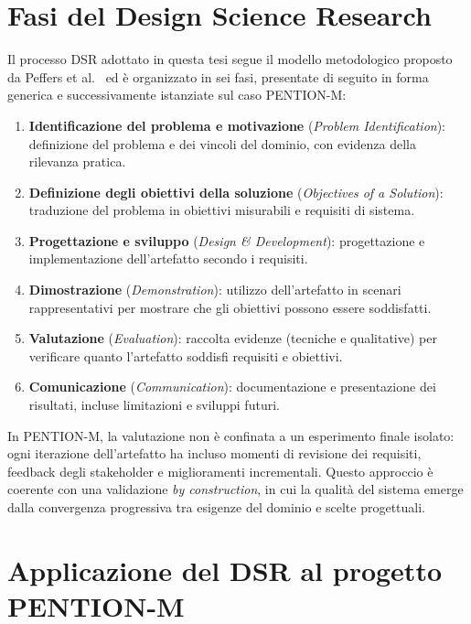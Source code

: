 \section{Fasi del Design Science Research}
\label{sec:dsr_phases}

Il processo DSR adottato in questa tesi segue il modello metodologico proposto da Peffers et al.~\cite{peffers2007dsr_process} ed è organizzato in sei fasi, presentate di seguito in forma generica e successivamente istanziate sul caso PENTION-M:

\begin{enumerate}
    \item \textbf{Identificazione del problema e motivazione} (\emph{Problem Identification}): definizione del problema e dei vincoli del dominio, con evidenza della rilevanza pratica.
    \item \textbf{Definizione degli obiettivi della soluzione} (\emph{Objectives of a Solution}): traduzione del problema in obiettivi misurabili e requisiti di sistema.
    \item \textbf{Progettazione e sviluppo} (\emph{Design \& Development}): progettazione e implementazione dell'artefatto secondo i requisiti.
    \item \textbf{Dimostrazione} (\emph{Demonstration}): utilizzo dell'artefatto in scenari rappresentativi per mostrare che gli obiettivi possono essere soddisfatti.
    \item \textbf{Valutazione} (\emph{Evaluation}): raccolta evidenze (tecniche e qualitative) per verificare quanto l'artefatto soddisfi requisiti e obiettivi.
    \item \textbf{Comunicazione} (\emph{Communication}): documentazione e presentazione dei risultati, incluse limitazioni e sviluppi futuri.
\end{enumerate}

In PENTION-M, la valutazione non è confinata a un esperimento finale isolato: ogni iterazione dell'artefatto ha incluso momenti di revisione dei requisiti, feedback degli stakeholder e miglioramenti incrementali.
Questo approccio è coerente con una validazione \emph{by construction}, in cui la qualità del sistema emerge dalla convergenza progressiva tra esigenze del dominio e scelte progettuali.

\section{Applicazione del DSR al progetto PENTION-M}
\label{sec:dsr_application}

